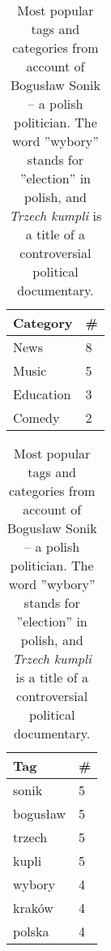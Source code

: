 \begin{table}[ht]
\begin{minipage}[b]{0.5\linewidth}\centering

\begin{tabular}{| l | l |}
Category & \# \\ \hline
News & 8 \\
Music & 5 \\
Education & 3 \\
Comedy & 2 \\
\end{tabular}

\end{minipage}
\hspace{0.5cm}
\begin{minipage}[b]{0.5\linewidth}
\centering

\begin{tabular}{| l | l |}
Tag & \# \\ \hline
sonik & 5 \\
bogusław & 5 \\
trzech & 5 \\
kupli & 5 \\
wybory & 4 \\
kraków & 4 \\
polska & 4 \\
\end{tabular}

\end{minipage}

\caption{Most popular tags and categories from account of Bogusław Sonik -- a
polish politician. The word ''wybory'' stands for ''election'' in polish, and
\emph{Trzech kumpli} is a title of a controversial political documentary.}
\end{table}


